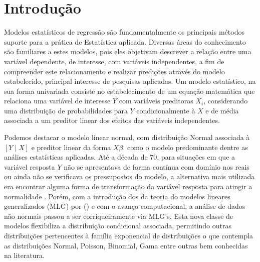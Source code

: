\documentclass[
12pt,				%
openright,			%
oneside,			%
a4paper,			%
english,			%
brazil,				%
]{abntex2}
\begin{document}

\imprimirfolhaderosto

\tableofcontents*
\cleardoublepage


\textual

\chapter{Introdução}
\label{cha:introducao}

Modelos estatísticos de regressão são fundamentalmente os principais
métodos suporte para a prática de Estatística aplicada. Diversas áreas
do conhecimento são familiares a estes modelos, pois eles objetivam
descrever a relação entre uma variável dependente, de interesse, com
variáveis independentes, a fim de compreender este relacionamento e
realizar predições através do modelo estabelecido, principal interesse
de pesquisas aplicadas. Um modelo estatístico, na sua forma univariada
consiste no estabelecimento de um equação matemática que relaciona uma
variável de interesse $Y$ com variáveis preditoras $X_i$, considerando
uma distribuição de probabilidades para $Y$ condicionalmente à $X$ e 
de média associada a um preditor linear dos efeitos das variáveis
independentes.

Podemos destacar o modelo linear normal, com distribuição Normal
associada à $[Y \mid X]$ e preditor linear da forma $X\beta$, como o
modelo predominante dentre as análises estatísticas aplicadas. Até a
década de 70, para situações em que a variável resposta $Y$ não se
apresentava de forma contínua com domínio nos reais ou ainda não se
verificava os pressupostos do modelo, a alternativa mais utilizada era
encontrar alguma forma de transformação da variável resposta para
atingir a normalidade \cite{Paula2013}. Porém, com a introdução dos
da teoria do modelos lineares generalizados (MLG) por
 (\citeyear{Nelder1972}) e com o avanço
computacional, a análise de dados não normais passou a ser
corriqueiramente via MLG's. Esta nova classe de modelos flexibiliza a 
distribuição condicional associada, permitindo outras distribuições
pertencentes à família exponencial de distribuições o que contempla as
distribuições Normal, Poisson, Binomial, Gama entre outras bem
conhecidas na literatura. 
\end{document}
